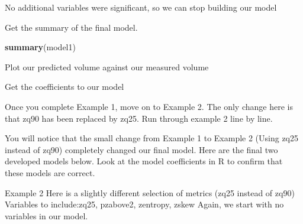 \documentclass[
]{book}
\newenvironment{Shaded}{\begin{snugshade}}{\end{snugshade}}
\newcommand{\AttributeTok}[1]{\textcolor[rgb]{0.13,0.29,0.53}{#1}}
\newcommand{\CommentTok}[1]{\textcolor[rgb]{0.56,0.35,0.01}{\textit{#1}}}
\newcommand{\DecValTok}[1]{\textcolor[rgb]{0.00,0.00,0.81}{#1}}
\newcommand{\FunctionTok}[1]{\textcolor[rgb]{0.13,0.29,0.53}{\textbf{#1}}}
\newcommand{\NormalTok}[1]{#1}
\newcommand{\SpecialCharTok}[1]{\textcolor[rgb]{0.81,0.36,0.00}{\textbf{#1}}}
\newcommand{\StringTok}[1]{\textcolor[rgb]{0.31,0.60,0.02}{#1}}
\begin{document}
No additional variables were significant, so we can stop building our model

Get the summary of the final model.

\begin{Shaded}
\begin{Highlighting}[]
\FunctionTok{summary}\NormalTok{(model1)}
\end{Highlighting}
\end{Shaded}

Plot our predicted volume against our measured volume

\begin{Shaded}
\end{Shaded}

Get the coefficients to our model

\begin{Shaded}
\end{Shaded}

Once you complete Example 1, move on to Example 2. The only change here is that zq90 has been replaced by zq25. Run through example 2 line by line.

You will notice that the small change from Example 1 to Example 2 (Using zq25 instead of zq90) completely changed our final model. Here are the final two developed models below. Look at the model coefficients in R to confirm that these models are correct.

Example 2 Here is a slightly different selection of metrics (zq25 instead of zq90) Variables to include:zq25, pzabove2, zentropy, zskew Again, we start with no variables in our model.
\end{document}
